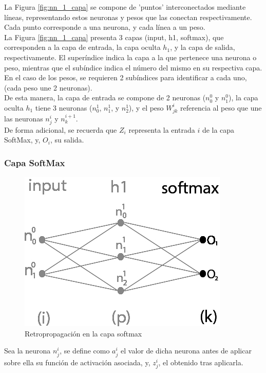 La Figura \ref{fig:nn_1_capa} se compone de 'puntos' interconectados mediante líneas, representando estos neuronas y pesos que las conectan respectivamente. Cada punto corresponde a una neurona, y cada línea a un peso. \\
La Figura \ref{fig:nn_1_capa} presenta 3 capas (input, h1, softmax), que corresponden a la capa de entrada, la capa oculta $h_1$, y la capa de salida, respectivamente. El superíndice indica la capa a la que pertenece una neurona o peso, mientras que el subíndice indica el número del mismo en su respectiva capa. En el caso de los pesos, se requieren 2 subíndices para identificar a cada uno, (cada peso une 2 neuronas). \\
De esta manera, la capa de entrada se compone de 2 neuronas ($n^{0}_0$ y $n^{0}_1$), la capa oculta $h_1$ tiene 3 neuronas ($n^1_{0}$, $n^1_{1}$, y $n^1_{2}$), y el peso $W^{i}_{jk}$ referencia al peso que une las neuronas $n^{i}_j$ y $n^{i+1}_k$.\\
De forma adicional, se recuerda que $Z_i$ representa la entrada $i$ de la capa SoftMax, y, $O_i$, su salida.  

\subsubsection{Capa SoftMax}

\begin{figure}[H]
	\centering
	\includegraphics[scale=0.35]{imagenes/nn_1_capa_output.jpg}  
	\caption{Retropropagación en la capa softmax}
	\label{fig:nn_1_capa_output}
\end{figure}

Sea la neurona $n^i_j$, se define como $a^i_j$ el valor de dicha neurona antes de aplicar sobre ella su función de activación asociada, y, $z^i_j$, el obtenido tras aplicarla. 

